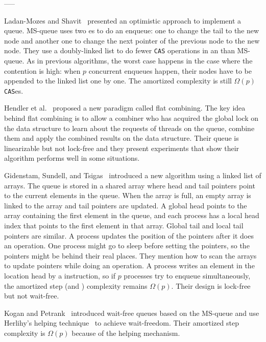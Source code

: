 -----

Ladan-Mozes and Shavit~\cite{DBLP:journals/dc/Ladan-MozesS08}
presented an optimistic approach to implement a queue. MS-queue uses
two es to do an enqueue: one to change the tail to the new
node and another one to change the next pointer of the previous node
to the new node. They use a doubly-linked list to do fewer
\texttt{CAS} operations in an  than MS-queue. As in
previous algorithms, the worst case happens in the case where the
contention is high: when $p$ concurrent enqueues happen, their nodes
have to be appended to the linked list one by one. The amortized
complexity is still $\Omega(p)$ \texttt{CAS}es. 

Hendler et al.~\cite{DBLP:conf/spaa/HendlerIST10} proposed a new
paradigm called flat combining. The key idea behind flat combining is
to allow a combiner who has acquired the global lock on the data
structure to learn about the requests of threads on the queue, combine
them and apply the combined results on the data structure. Their queue
is linearizable but not lock-free and they present experiments that
show their algorithm performs well in some situations. 

Gidenstam, Sundell, and Tsigas~\cite{DBLP:conf/opodis/GidenstamST10}
introduced a new algorithm using a linked list of arrays. The queue is
stored in a shared array where head and tail pointers point to the
current elements in the queue. When the array is full, an empty array
is linked to the array and tail pointers are updated. A global head
points to the array containing the first element in the queue, and
each process has a local head index that points to the first element
in that array. Global tail and local tail pointers are similar. A
process updates the position of the pointers after it does an
operation. One process might go to sleep before setting the pointers,
so the pointers might be behind their real places. They mention how to
scan the arrays to update pointers while doing an operation. A process
writes an element in the location head by a  instruction, so
if $p$ processes try to enqueue simultaneously, the amortized step
(and ) complexity remains $\Omega(p)$. Their design is
lock-free but not wait-free. 

Kogan and Petrank~\cite{DBLP:conf/ppopp/KoganP11} introduced wait-free
queues based on the MS-queue and use Herlihy's helping
technique~\cite{10.1145/114005.102808} to achieve wait-freedom. Their
amortized step complexity is $\Omega(p)$ because of the helping
mechanism. 

